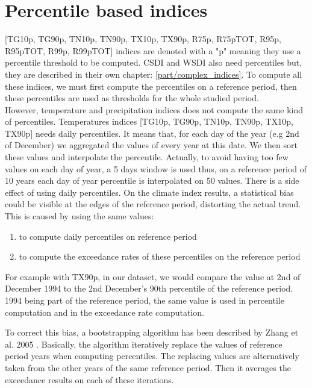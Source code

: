 \documentclass[a4paper,11pt]{article}
\begin{document}
    \section{Percentile based indices}
        [TG10p, TG90p, TN10p, TN90p, TX10p, TX90p, R75p, R75pTOT, R95p, R95pTOT, R99p, R99pTOT] indices are denoted with a "p" meaning they use a percentile threshold to be computed. 
        CSDI and WSDI also need percentiles but, they are described in their own chapter: \ref{part/complex_indices}.
        To compute all these indices, we must first compute the percentiles on a reference period, then these percentiles are used as thresholds for the whole studied period.\\

        However, temperature and precipitation indices does not compute the same kind of percentiles.
        Temperatures indices [TG10p, TG90p, TN10p, TN90p, TX10p, TX90p] needs daily percentiles. It means that, for each day of the year (e.g 2nd of December) we aggregated the values of every year at this date. We then sort these values and interpolate the percentile.
        Actually, to avoid having too few values on each day of year, a 5 days window is used thus, on a reference period of 10 years each day of year percentile is interpolated on 50 values.
        There is a side effect of using daily percentiles. On the climate index results, a statistical bias could be visible at the edges of the reference period, distorting the actual trend.
        This is caused by using the same values:
        \begin{enumerate}
            \item to compute daily percentiles on reference period
            \item to compute the exceedance rates of these percentiles on the reference period
        \end{enumerate}
        For example with TX90p, in our dataset, we would compare the value at 2nd of December 1994 to the 2nd December's 90th percentile of the reference period. 
        1994 being part of the reference period, the same value is used in percentile computation and in the exceedance rate computation.

        To correct this bias, a bootstrapping algorithm has been described by Zhang et al. 2005 \cite{quote/zhang_et_al}.
        Basically, the algorithm iteratively replace the values of reference period years when computing percentiles.
        The replacing values are alternatively taken from the other years of the same reference period.
        Then it averages the exceedance results on each of these iterations.
\end{document}
